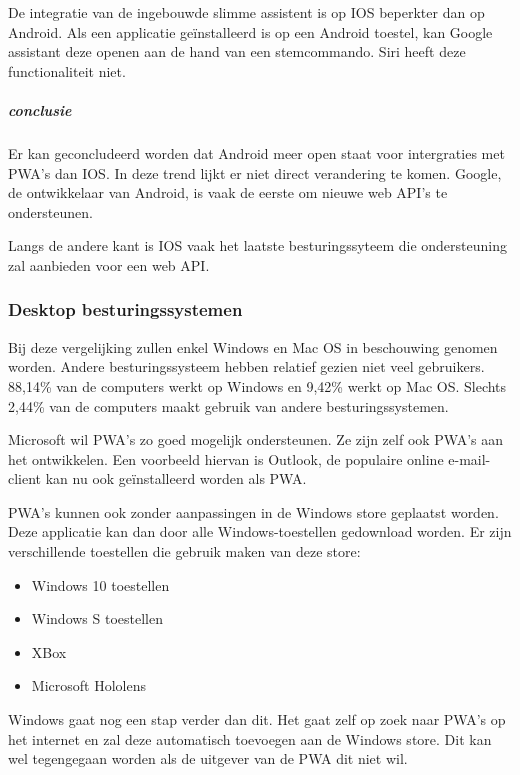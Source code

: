 	De integratie van de ingebouwde slimme assistent is op IOS beperkter dan op Android. Als een applicatie geïnstalleerd is op een Android toestel, kan Google assistant deze openen aan de hand van een stemcommando. Siri heeft deze functionaliteit niet.
	\autocite{Lathiya2020}
	
	\subparagraph{conclusie}
	
		Er kan geconcludeerd worden dat Android meer open staat voor intergraties met PWA's dan IOS. In deze trend lijkt er niet direct verandering te komen. Google, de ontwikkelaar van Android, is vaak de eerste om nieuwe web API's te ondersteunen.
		
		Langs de andere kant is IOS vaak het laatste besturingssyteem die ondersteuning zal aanbieden voor een web API.


\subsubsection{Desktop besturingssystemen}
	Bij deze vergelijking zullen enkel Windows en Mac OS in beschouwing genomen worden. Andere besturingssysteem hebben relatief gezien niet veel gebruikers. 88,14\% van de computers werkt op Windows en 9,42\% werkt op Mac OS. Slechts 2,44\% van de computers maakt gebruik van andere besturingssystemen.
	\autocite{netMarketShare2020}
	
	Microsoft wil PWA's zo goed mogelijk ondersteunen. Ze zijn zelf ook PWA's aan het ontwikkelen. Een voorbeeld hiervan is Outlook, de populaire online e-mail-client kan nu ook geïnstalleerd worden als PWA.
	\autocite{Microsoft2020a}
	
	PWA's kunnen ook zonder aanpassingen in de Windows store geplaatst worden. Deze applicatie kan dan door alle Windows-toestellen gedownload worden. Er zijn verschillende toestellen die gebruik maken van deze store:
	\begin{itemize}
		\item	Windows 10 toestellen
		\item	Windows S toestellen
		\item	XBox
		\item	Microsoft Hololens 
	\end{itemize}
	
	Windows gaat nog een stap verder dan dit. Het gaat zelf op zoek naar PWA's op het internet en zal deze automatisch toevoegen aan de Windows store. Dit kan wel tegengegaan worden als de uitgever van de PWA dit niet wil.
	\autocite{Gustafson2017} \autocite{Gustafson2017a}
	
